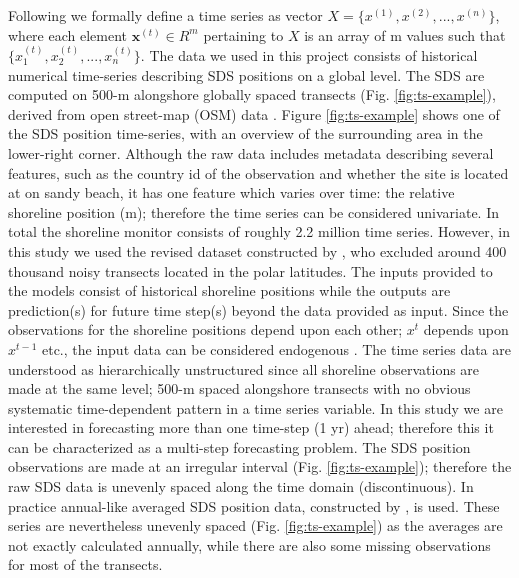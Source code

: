 \documentclass[format=sigconf, review=false, screen=true]{acmart}
\begin{document}
Following \citet{malhotra2015long} we formally define a time series as vector $X = \{x^{(1)}, x^{(2)},..., x^{(n)}\}$, where each element $\mathbf{x}^{(t)} \in R^{m}$ pertaining to $X$ is an array of m values such that $\{x_1^{(t)}, x_2^{(t)},..., x_n^{(t)} \}$. The data we used in this project consists of historical numerical time-series describing SDS positions on a global level. The SDS are computed on 500-m alongshore globally spaced transects (Fig. \ref{fig:ts-example}), derived from open street-map (OSM) data \cite{Luijendijk2018state}. Figure \ref{fig:ts-example} shows one of the SDS position time-series, with an overview of the surrounding area in the lower-right corner. Although the raw data includes metadata describing several features, such as the country id of the observation and whether the site is located at on sandy beach, it has one feature which varies over time: the relative shoreline position (m); therefore the time series can be considered univariate. In total the shoreline monitor consists of roughly 2.2 million time series. However, in this study we used the revised dataset constructed by \citet{Kras2019shoreline}, who excluded around 400 thousand noisy transects located in the polar latitudes. The inputs provided to the models consist of historical shoreline positions while the outputs are prediction(s) for future time step(s) beyond the data provided as input. Since the observations for the shoreline positions depend upon each other; $x^{t}$ depends upon $x^{t-1}$ etc., the input data can be considered endogenous \citep{brownlee2018deep}. The time series data are understood as hierarchically unstructured \citep{pmlr-v89-mariet19a} since all shoreline observations are made at the same level; 500-m spaced alongshore transects with no obvious systematic time-dependent pattern in a time series variable. In this study we are interested in forecasting more than one time-step (1 yr) ahead; therefore this it can be characterized as a multi-step forecasting problem. The SDS position observations are made at an irregular interval (Fig. \ref{fig:ts-example}); therefore the raw SDS data is unevenly spaced along the time domain (discontinuous). In practice annual-like averaged SDS position data, constructed by \citet{Luijendijk2018state}, is used. These series are nevertheless unevenly spaced (Fig. \ref{fig:ts-example}) as the averages are not exactly calculated annually, while there are also some missing observations for most of the transects.
\end{document}
